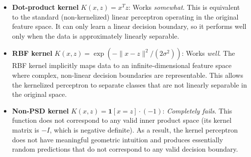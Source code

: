 \begin{answer}
\begin{itemize}

\item \textbf{Dot-product kernel} $K(x,z) = x^Tz$: Works \textit{somewhat}. This is equivalent to the standard (non-kernelized) linear perceptron operating in the original feature space. It can only learn a linear decision boundary, so it performs well only when the data is approximately linearly separable.

\item \textbf{RBF kernel} $K(x,z) = \exp\!\left(-\|x-z\|^2 / (2\sigma^2)\right)$: Works \textit{well}. The RBF kernel implicitly maps data to an infinite-dimensional feature space where complex, non-linear decision boundaries are representable. This allows the kernelized perceptron to separate classes that are not linearly separable in the original space.

\item \textbf{Non-PSD kernel} $K(x,z) = \mathbf{1}[x = z] \cdot (-1)$: \textit{Completely fails}. This function does not correspond to any valid inner product space (its kernel matrix is $-I$, which is negative definite). As a result, the kernel perceptron does not have meaningful geometric intuition and produces essentially random predictions that do not correspond to any valid decision boundary.

\end{itemize}
\end{answer}
